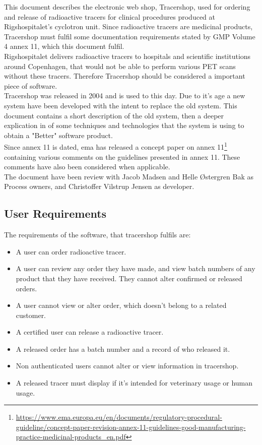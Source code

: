 \documentclass{article}
\begin{document}
This document describes the electronic web shop, Tracershop, used for ordering and release of radioactive tracers for clinical procedures produced at Rigshospitalet's cyclotron unit. Since radioactive tracers are medicinal products, Tracershop must fulfil some documentation requirements stated by GMP Volume 4 annex 11, which this document fulfil.\\
Rigshospitalet delivers radioactive tracers to hospitals and scientific institutions around Copenhagen, that would not be able to perform various PET scans without these tracers. Therefore Tracershop should be considered a important piece of software.\\
Tracershop was released in 2004 and is used to this day. Due to it's age a new system have been developed with the intent to replace the old system. This document contains a short description of the old system, then a deeper explication in of some techniques and technologies that the system is using to obtain a "Better" software product.\\
Since annex 11 is dated, \gls*{ema} has released a concept paper on annex 11\footnote{\url{https://www.ema.europa.eu/en/documents/regulatory-procedural-guideline/concept-paper-revision-annex-11-guidelines-good-manufacturing-practice-medicinal-products_en.pdf}} containing various comments on the guidelines presented in annex 11. These comments have also been considered when applicable. \\
The document have been review with Jacob Madsen and Helle Østergren Bak as Process owners, and Christoffer Vilstrup Jensen as developer.

\subsection*{User Requirements}

The requirements of the software, that tracershop fulfils are:

\begin{itemize}
  \item A user can order radioactive tracer.
  \item A user can review any order they have made, and view batch numbers of any product that they have received. They cannot alter confirmed or released orders.
  \item A user cannot view or alter order, which doesn't belong to a related customer.
  \item A certified user can release a radioactive tracer.
  \item A released order has a batch number and a record of who released it.
  \item Non authenticated users cannot alter or view information in tracershop.
  \item A released tracer must display if it's intended for veterinary usage or human usage.
\end{itemize}
\end{document}
